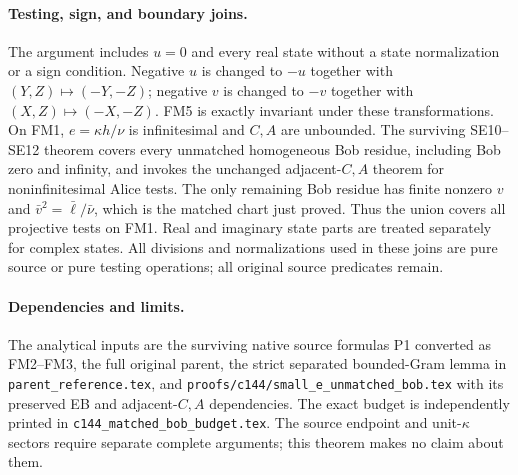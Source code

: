 \paragraph{Testing, sign, and boundary joins.}
The argument includes $u=0$ and every real state without a state
normalization or a sign condition. Negative $u$ is changed to
$-u$ together with $(Y,Z)\mapsto(-Y,-Z)$; negative $v$ is
changed to $-v$ together with $(X,Z)\mapsto(-X,-Z)$.
FM5 is exactly invariant under these transformations. On FM1,
$e=\kappa h/\nu$ is infinitesimal and $C,A$ are unbounded.
The surviving SE10--SE12 theorem covers every unmatched
homogeneous Bob residue, including Bob zero and infinity,
and invokes the unchanged adjacent-$C,A$ theorem for
noninfinitesimal Alice tests. The only remaining Bob residue
has finite nonzero $v$ and $\bar v^2=\bar\ell/\bar\nu$,
which is the matched chart just proved. Thus the union covers
all projective tests on FM1. Real and imaginary state parts
are treated separately for complex states. All divisions and
normalizations used in these joins are pure source or pure
testing operations; all original source predicates remain.

\paragraph{Dependencies and limits.}
The analytical inputs are the surviving native source formulas
P1 converted as FM2--FM3, the full original parent, the strict
separated bounded-Gram lemma in \texttt{parent\_reference.tex},
and \texttt{proofs/c144/small\_e\_unmatched\_bob.tex}
with its preserved EB and adjacent-$C,A$ dependencies.
The exact budget is independently printed in
\texttt{c144\_matched\_bob\_budget.tex}. The source endpoint
and unit-$\kappa$ sectors require separate complete arguments;
this theorem makes no claim about them.
